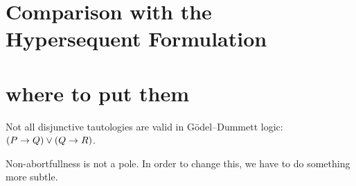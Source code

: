 
\section{Comparison with the Hypersequent Formulation}


\section*{where to put them}

Not all disjunctive tautologies are valid in G\"odel--Dummett logic:
$(P\rightarrow Q)\lor(Q\rightarrow R)$.

Non-abortfullness is not a pole.
In order to change this, we have to do something more subtle.
